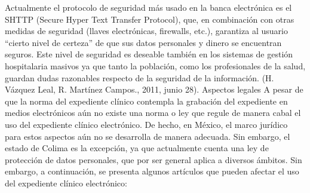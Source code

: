 Actualmente el protocolo de seguridad más usado en la banca electrónica es el SHTTP (Secure Hyper Text Transfer Protocol), que, en combinación con otras medidas de seguridad (llaves electrónicas, firewalls, etc.), garantiza al usuario “cierto nivel de certeza” de que sus datos personales y dinero se encuentran seguros. Este nivel de seguridad es deseable también en los sistemas de gestión hospitalaria masivos ya que tanto la población, como los profesionales de la salud, guardan dudas razonables respecto de la seguridad de la información. (H. Vázquez Leal, R. Martínez Campos., 2011, junio 28).
Aspectos legales
A pesar de que la norma del expediente clínico contempla la grabación del expediente en medios electrónicos aún no existe una norma o ley que regule de manera cabal el uso del expediente clínico electrónico. De hecho, en México, el marco jurídico para estos aspectos aún no se desarrolla de manera adecuada. Sin embargo, el estado de Colima es la excepción, ya que actualmente cuenta una ley de protección de datos personales, que por ser general aplica a diversos ámbitos. Sin embargo, a continuación, se presenta algunos artículos que pueden afectar el uso del expediente clínico electrónico:
